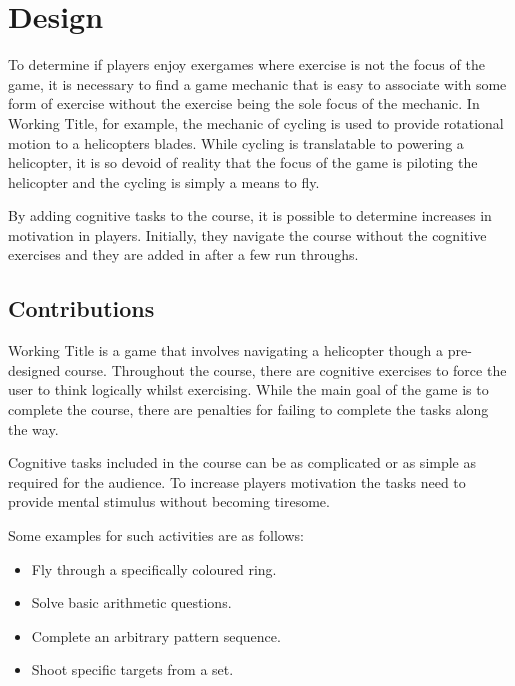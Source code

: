 \documentclass[11pt]{article}
\begin{document}
\clearpage

\section{Design}
\begin{multicols}{2}

To determine if players enjoy exergames where exercise is not the focus of the game, it is necessary to find a game mechanic that is easy to associate with some form of exercise without the exercise being the sole focus of the mechanic. In Working Title, for example, the mechanic of cycling is used to provide rotational motion to a helicopters blades. While cycling is translatable to powering a helicopter, it is so devoid of reality that the focus of the game is piloting the helicopter and the cycling is simply a means to fly.

By adding cognitive tasks to the course, it is possible to determine increases in motivation in players. Initially, they navigate the course without the cognitive exercises and they are added in after a few run throughs.

\subsection{Contributions}

Working Title is a game that involves navigating a helicopter though a pre-designed course. Throughout the course, there are cognitive exercises to force the user to think logically whilst exercising. While the main goal of the game is to complete the course, there are penalties for failing to complete the tasks along the way.

Cognitive tasks included in the course can be as complicated or as simple as required for the audience. To increase players motivation the tasks need to provide mental stimulus without becoming tiresome.

Some examples for such activities are as follows:
\begin{itemize}
	\item Fly through a specifically coloured ring.
	\item Solve basic arithmetic questions.
	\item Complete an arbitrary pattern sequence.
	\item Shoot specific targets from a set.
\end{itemize}

\end{multicols}
\end{document}
